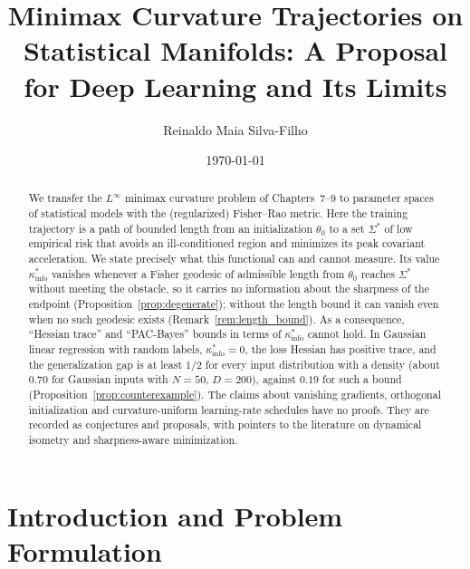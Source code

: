 \documentclass[11pt,reqno]{amsart}
\theoremstyle{definition}
\numberwithin{equation}{section}
\begin{document}
\title[Minimax Curvature on Statistical Manifolds]{Minimax Curvature Trajectories on Statistical Manifolds: A Proposal for Deep Learning and Its Limits}

\author{Reinaldo Maia Silva-Filho}
\address{Programa de P\'os-Gradua\c{c}\~ao em Estat\'istica e Experimenta\c{c}\~ao Agropecu\'aria (PPGEE/DES), Universidade Federal de Lavras (UFLA)}

\date{\today}

\begin{abstract}
We transfer the $L^\infty$ minimax curvature problem of Chapters~7--9 to parameter spaces of statistical models with the (regularized) Fisher--Rao metric. Here the training trajectory is a path of bounded length from an initialization $\theta_0$ to a set $\Sigma^*$ of low empirical risk that avoids an ill-conditioned region and minimizes its peak covariant acceleration. We state precisely what this functional can and cannot measure. Its value $\kappa^*_{\mathrm{info}}$ vanishes whenever a Fisher geodesic of admissible length from $\theta_0$ reaches $\Sigma^*$ without meeting the obstacle, so it carries no information about the sharpness of the endpoint (Proposition~\ref{prop:degenerate}); without the length bound it can vanish even when no such geodesic exists (Remark~\ref{rem:length_bound}). As a consequence, ``Hessian trace'' and ``PAC-Bayes'' bounds in terms of $\kappa^*_{\mathrm{info}}$ cannot hold. In Gaussian linear regression with random labels, $\kappa^*_{\mathrm{info}} = 0$, the loss Hessian has positive trace, and the generalization gap is at least $1/2$ for every input distribution with a density (about $0.70$ for Gaussian inputs with $N = 50$, $D = 200$), against $0.19$ for such a bound (Proposition~\ref{prop:counterexample}). The claims about vanishing gradients, orthogonal initialization and curvature-uniform learning-rate schedules have no proofs. They are recorded as conjectures and proposals, with pointers to the literature on dynamical isometry and sharpness-aware minimization.
\end{abstract}

\maketitle

\tableofcontents
\newpage

\section{Introduction and Problem Formulation}
\end{document}
